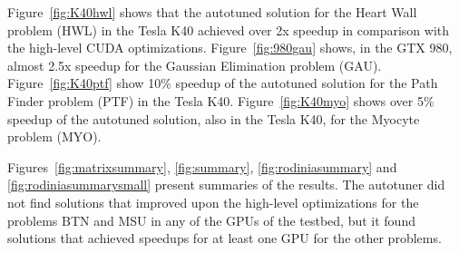 Figure~\ref{fig:K40hwl} shows that the autotuned solution for the Heart Wall
problem (HWL) in the Tesla K40 achieved over 2x speedup in comparison with the
high-level CUDA optimizations.  Figure~\ref{fig:980gau} shows, in the GTX 980,
almost 2.5x speedup for the Gaussian Elimination problem (GAU).
Figure~\ref{fig:K40ptf} show 10\% speedup of the autotuned solution for the
Path Finder problem (PTF) in the Tesla K40.  Figure~\ref{fig:K40myo} shows over
5\% speedup of the autotuned solution, also in the Tesla K40, for the Myocyte
problem (MYO).

Figures~\ref{fig:matrixsummary}, \ref{fig:summary}, \ref{fig:rodiniasummary}
and \ref{fig:rodiniasummarysmall} present summaries of the results. The
autotuner did not find solutions that improved upon the high-level
optimizations for the problems BTN and MSU in any of the GPUs of the testbed,
but it found solutions that achieved speedups for at least one GPU for the
other problems.

